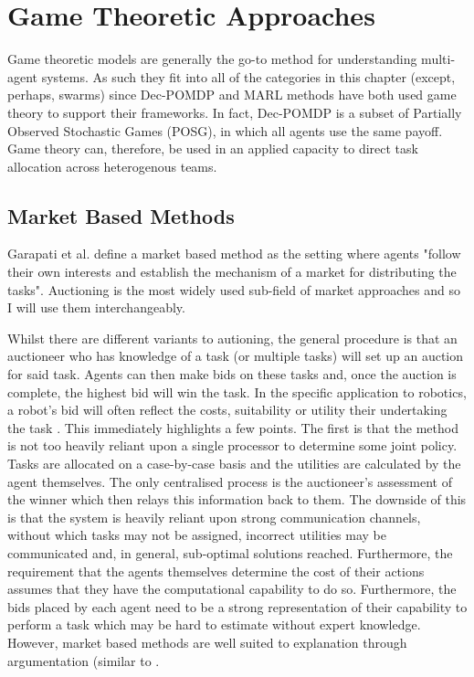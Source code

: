 \documentclass[preprint,11pt]{report}
\begin{document}
\section{Game Theoretic Approaches}

Game theoretic models are generally the go-to method for understanding multi-agent systems. As such
they fit into all of the categories in this chapter (except, perhaps, swarms) since Dec-POMDP and
MARL methods have both used game theory to support their frameworks. In fact, Dec-POMDP is a subset
of Partially Observed Stochastic Games (POSG), in which all agents use the same payoff. Game theory
can, therefore, be used in an applied capacity to direct task allocation across heterogenous teams.

\subsection{Market Based Methods}

Garapati et al. \cite{Garapati2018AMissions} define a market based method as the setting where
agents "follow their own interests and establish the mechanism of a market for distributing the
tasks". Auctioning is the most widely used sub-field of market approaches and so I will use them
interchangeably. 

Whilst there are different variants to autioning, the general procedure is that an auctioneer who
has knowledge of a task (or multiple tasks) will set up an auction for said task. Agents can then
make bids on these tasks and, once the auction is complete, the highest bid will win the task. In
the specific application to robotics, a robot's bid will often reflect the costs, suitability or
utility their undertaking the task \cite{BernardineDias2006Market-basedAnalysis}. This immediately
highlights a few points. The first is that the method is not too heavily reliant upon a single
processor to determine some joint policy. Tasks are allocated on a case-by-case basis and the
utilities are calculated by the agent themselves. The only centralised process is the auctioneer's
assessment of the winner which then relays this information back to them. The downside of this is
that the system is heavily reliant upon strong communication channels, without which tasks may not
be assigned, incorrect utilities may be communicated and, in general, sub-optimal solutions reached.
Furthermore, the requirement that the agents themselves determine the cost of their actions assumes
that they have the computational capability to do so. Furthermore, the bids placed by each agent
need to be a strong representation of their capability to perform a task which may be hard to
estimate without expert knowledge. However, market based methods are well suited to explanation
through argumentation (similar to \cite{Jung2001DistributedArgumentation}. 
\end{document}
